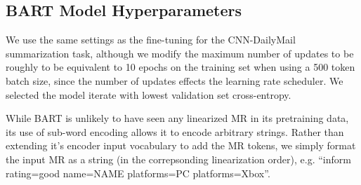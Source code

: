 


\subsection{BART Model Hyperparameters}

We use the same settings as the fine-tuning for the CNN-DailyMail 
summarization task,
although we modify the maximum number of updates to be roughly to be 
equivalent to 10 epochs on the training set when using a 500 token batch
size, since 
the number of updates effects
the learning rate scheduler. We selected the model iterate with 
lowest validation set cross-entropy. 

While BART is unlikely to have seen any linearized MR in its pretraining
data, its use of sub-word encoding  allows it to encode
arbitrary strings. Rather than extending it's encoder input vocabulary to
add the MR tokens, we simply format the input MR as a string 
(in the correpsonding linearization order), e.g. ``inform rating=good name=NAME platforms=PC platforms=Xbox''.

\clearpage

